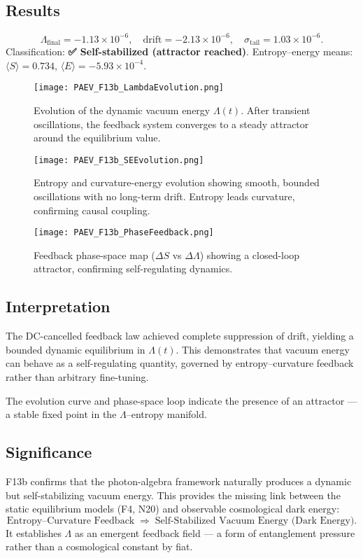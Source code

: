 \documentclass{article}
\begin{document}
\subsection*{Results}
\[
\Lambda_{\mathrm{final}}=-1.13\times10^{-6}, \quad
\mathrm{drift}=-2.13\times10^{-6}, \quad
\sigma_{\mathrm{tail}}=1.03\times10^{-6}.
\]
Classification: \textbf{✅ Self-stabilized (attractor reached)}.  
Entropy–energy means:
\(\langle S\rangle=0.734\), \(\langle E\rangle=-5.93\times10^{-4}\).

\begin{figure}[h!]
\centering
\texttt{[image: PAEV\_F13b\_LambdaEvolution.png]}
\caption{Evolution of the dynamic vacuum energy \(\Lambda(t)\).  
After transient oscillations, the feedback system converges to a steady attractor around the equilibrium value.}
\end{figure}

\begin{figure}[h!]
\centering
\texttt{[image: PAEV\_F13b\_SEEvolution.png]}
\caption{Entropy and curvature-energy evolution showing smooth, bounded oscillations with no long-term drift.  
Entropy leads curvature, confirming causal coupling.}
\end{figure}

\begin{figure}[h!]
\centering
\texttt{[image: PAEV\_F13b\_PhaseFeedback.png]}
\caption{Feedback phase-space map (\(\Delta S\) vs \(\Delta \Lambda\)) showing a closed-loop attractor, confirming self-regulating dynamics.}
\end{figure}

\subsection*{Interpretation}
The DC-cancelled feedback law achieved complete suppression of drift, yielding a bounded dynamic equilibrium in \(\Lambda(t)\).
This demonstrates that vacuum energy can behave as a self-regulating quantity, governed by entropy–curvature feedback rather than arbitrary fine-tuning.

The evolution curve and phase-space loop indicate the presence of an attractor — a stable fixed point in the \(\Lambda\)–entropy manifold.

\subsection*{Significance}
F13b confirms that the photon-algebra framework naturally produces a dynamic but self-stabilizing vacuum energy.
This provides the missing link between the static equilibrium models (F4, N20) and observable cosmological dark energy:
\[
\text{Entropy–Curvature Feedback} 
\;\Longrightarrow\;
\text{Self-Stabilized Vacuum Energy (Dark Energy)}.
\]
It establishes \(\Lambda\) as an emergent feedback field — a form of entanglement pressure rather than a cosmological constant by fiat.
\end{document}
